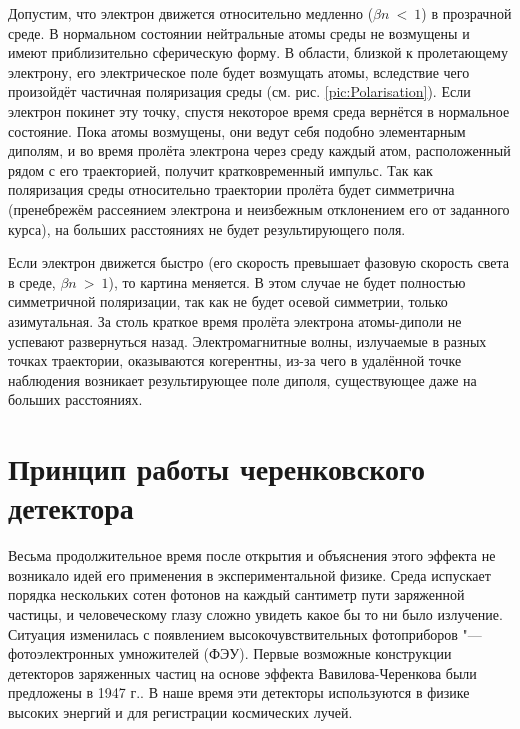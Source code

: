 \documentclass[12pt,a4paper]{report} %
\begin{document}
Допустим, что электрон движется относительно медленно ($\beta n~<~1$) в прозрачной среде. В нормальном состоянии нейтральные атомы среды не возмущены и имеют приблизительно сферическую форму. В области, близкой к пролетающему электрону, его электрическое поле будет возмущать атомы, вследствие чего произойдёт частичная поляризация среды (см. рис. \ref{pic:Polarisation}). Если электрон покинет эту точку, спустя некоторое время среда вернётся в нормальное состояние. Пока атомы возмущены, они ведут себя подобно элементарным диполям, и во время пролёта электрона через среду каждый атом, расположенный рядом с его траекторией, получит кратковременный импульс. Так как поляризация среды относительно траектории пролёта будет симметрична (пренебрежём рассеянием электрона и неизбежным отклонением его от заданного курса), на больших расстояниях не будет результирующего поля.

Если электрон движется быстро (его скорость превышает фазовую скорость света в среде, $\beta n~ >~ 1$), то картина меняется. В этом случае не будет полностью симметричной поляризации, так как не будет осевой симметрии, только азимутальная. За столь краткое время пролёта электрона атомы-диполи не успевают развернуться назад.
Электромагнитные волны, излучаемые в разных точках траектории, оказываются когерентны, из-за чего в удалённой точке наблюдения возникает результирующее поле диполя, существующее даже на больших расстояниях. 
\section{Принцип работы черенковского детектора}

Весьма продолжительное время после открытия и объяснения этого эффекта не возникало идей его применения в экспериментальной физике. Среда испускает порядка нескольких сотен фотонов на каждый сантиметр пути заряженной частицы, и человеческому глазу  сложно увидеть какое бы то ни было излучение. Ситуация изменилась с появлением высокочувствительных фотоприборов "--- фотоэлектронных умножителей (ФЭУ). Первые возможные конструкции детекторов заряженных частиц на основе эффекта Вавилова-Черенкова были предложены в 1947 г.. В наше время эти детекторы используются в физике высоких энергий и для регистрации космических лучей.
\end{document}
